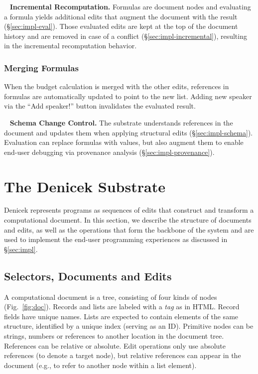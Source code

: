 \documentclass[sigconf,anonymous,screen]{acmart}
\newcommand*\circled[1]{\textnormal{\footnotesize\sffamily\bfseries\protect\tikz[baseline=(char.base)]{
  \node[shape=circle,fill=black,text=white,draw,inner sep=1pt] (char) {#1};}}}
\DeclareRobustCommand{\keyideabox}[3]{\begin{tcolorbox}[breakable,
  boxsep=5pt,left=0pt,right=0pt,top=0pt,bottom=0pt,width=\dimexpr\columnwidth\relax,
  colback=gray!20,colframe=gray!20,
  enlarge bottom by=0pt,enlarge top by=0pt,
  arc=0pt,outer arc=0pt]
\lettrine[lraise=0.3]{\LARGE #1}{~}
\small \textbf{#2.} #3
\end{tcolorbox}
}
\begin{document}
\keyideabox{\faLightbulbO}{Incremental Recomputation}{Formulas are document nodes and
evaluating a formula yields additional edits that augment the document with the result
(\S\ref{sec:impl-eval}). Those evaluated edits are kept at the top of the document history and are
removed in case of a conflict (\S\ref{sec:impl-incremental}), resulting in the incremental
recomputation behavior.}

\subsubsection*{\circled{G} Merging Formulas} When the budget calculation is merged with the
other edits, references in formulas are automatically updated to point to the new list.
Adding new speaker via the ``Add speaker!'' button invalidates the evaluated result.

\keyideabox{\faLightbulbO}{Schema Change Control}{The substrate understands references in
the document and updates them when applying structural edits (\S\ref{sec:impl-schema}).
Evaluation can replace formulas with values, but also augment them to enable
end-user debugging via provenance analysis (\S\ref{sec:impl-provenance}).}


\section{The Denicek Substrate}
\label{sec:system}
Denicek represents programs as sequences of edits that construct and transform a computational
document. In this section, we describe the structure of documents and edits, as well as the
operations that form the backbone of the system and are used to implement the
end-user programming experiences as discussed in \S\ref{sec:impl}.


\subsection{Selectors, Documents and Edits}
\label{sec:system-defs}
A computational document is a tree, consisting of four kinds of nodes (Fig.~\ref{fig:doc}).
Records and lists are labeled with a \emph{tag} as in HTML. Record fields have unique names.
Lists are expected to contain elements of the same structure, identified by a unique index (serving
as an ID). Primitive nodes can be strings, numbers or references to another location in the
document tree. References can be relative or absolute. Edit operations only use absolute
references (to denote a target node), but relative references can appear in the document (e.g., to
refer to another node within a list element).
\end{document}

